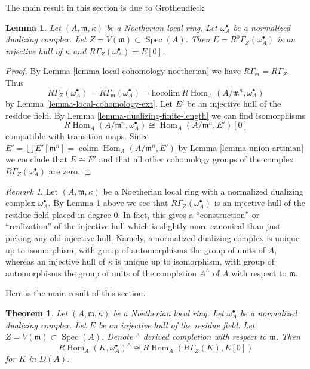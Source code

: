 \documentclass{stacks-project}
\theoremstyle{plain}
\newtheorem{theorem}[subsection]{Theorem}
\newtheorem{lemma}[subsection]{Lemma}
\theoremstyle{definition}
\theoremstyle{remark}
\newtheorem{remark}[subsection]{Remark}
\numberwithin{equation}{subsection}
\def\colim{\mathop{\mathrm{colim}}\nolimits}
\def\Spec{\mathop{\mathrm{Spec}}}
\def\Hom{\mathop{\mathrm{Hom}}\nolimits}
\begin{document}
\noindent
The main result in this section is due to Grothendieck.

\begin{lemma}
\label{lemma-local-cohomology-of-dualizing}
Let $(A, \mathfrak m, \kappa)$ be a Noetherian local ring.
Let $\omega_A^\bullet$ be a normalized dualizing complex.
Let $Z = V(\mathfrak m) \subset \Spec(A)$.
Then $E = R^0\Gamma_Z(\omega_A^\bullet)$ is an injective hull of
$\kappa$ and $R\Gamma_Z(\omega_A^\bullet) = E[0]$.
\end{lemma}

\begin{proof}
By Lemma \ref{lemma-local-cohomology-noetherian} we have
$R\Gamma_{\mathfrak m} = R\Gamma_Z$. Thus
$$
R\Gamma_Z(\omega_A^\bullet) =
R\Gamma_{\mathfrak m}(\omega_A^\bullet) =
\text{hocolim}\ R\Hom_A(A/\mathfrak m^n, \omega_A^\bullet)
$$
by Lemma \ref{lemma-local-cohomology-ext}. Let $E'$ be an injective
hull of the residue field.
By Lemma \ref{lemma-dualizing-finite-length}
we can find isomorphisms
$$
R\Hom_A(A/\mathfrak m^n, \omega_A^\bullet) \cong \Hom_A(A/\mathfrak m^n, E')[0]
$$
compatible with transition maps. Since
$E' = \bigcup E'[\mathfrak m^n] = \colim \Hom_A(A/\mathfrak m^n, E')$
by Lemma \ref{lemma-union-artinian}
we conclude that $E \cong E'$ and that all other cohomology
groups of the complex $R\Gamma_Z(\omega_A^\bullet)$ are zero.
\end{proof}

\begin{remark}
\label{remark-specific-injective-hull}
Let $(A, \mathfrak m, \kappa)$ be a Noetherian local ring
with a normalized dualizing complex $\omega_A^\bullet$.
By Lemma \ref{lemma-local-cohomology-of-dualizing}
above we see that $R\Gamma_Z(\omega_A^\bullet)$
is an injective hull of the residue field placed in degree $0$.
In fact, this gives a ``construction'' or ``realization''
of the injective hull which is slightly more canonical than
just picking any old injective hull. Namely, a normalized
dualizing complex is unique up to isomorphism, with group
of automorphisms the group of units of $A$, whereas an
injective hull of $\kappa$ is unique up to isomorphism, with
group of automorphisms the group of units of the completion
$A^\wedge$ of $A$ with respect to $\mathfrak m$.
\end{remark}

\noindent
Here is the main result of this section.

\begin{theorem}
\label{theorem-local-duality}
Let $(A, \mathfrak m, \kappa)$ be a Noetherian local ring.
Let $\omega_A^\bullet$ be a normalized dualizing complex.
Let $E$ be an injective hull of the residue field.
Let $Z = V(\mathfrak m) \subset \Spec(A)$.
Denote ${}^\wedge$ derived completion with respect to $\mathfrak m$.
Then
$$
R\Hom_A(K, \omega_A^\bullet)^\wedge \cong R\Hom_A(R\Gamma_Z(K), E[0])
$$
for $K$ in $D(A)$.
\end{theorem}
\end{document}
